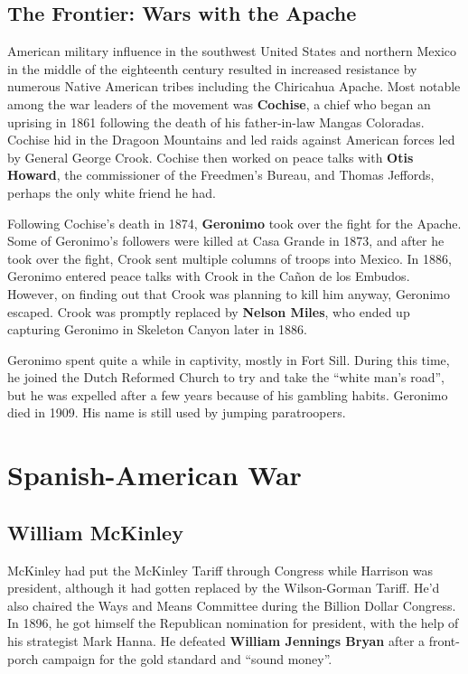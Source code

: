\subsection*{The Frontier: Wars with the Apache}

American military influence in the southwest United States and northern Mexico in the middle of the eighteenth century
resulted in increased resistance by numerous Native American tribes including the Chiricahua Apache.
Most notable among the war leaders of the movement was \textbf{Cochise},
a chief who began an uprising in 1861 following the death of his father-in-law Mangas Coloradas.
Cochise hid in the Dragoon Mountains and led raids against American forces led by General George Crook.
Cochise then worked on peace talks with \textbf{Otis Howard}, the commissioner of the Freedmen's Bureau,
and Thomas Jeffords, perhaps the only white friend he had.

Following Cochise's death in 1874, \textbf{Geronimo} took over the fight for the Apache.
Some of Geronimo's followers were killed at Casa Grande in 1873,
and after he took over the fight, Crook sent multiple columns of troops into Mexico.
In 1886, Geronimo entered peace talks with Crook in the Ca\~non de los Embudos.
However, on finding out that Crook was planning to kill him anyway, Geronimo escaped.
Crook was promptly replaced by \textbf{Nelson Miles}, who ended up capturing Geronimo in Skeleton Canyon later in 1886.

Geronimo spent quite a while in captivity, mostly in Fort Sill.
During this time, he joined the Dutch Reformed Church to try and take the ``white man's road'',
but he was expelled after a few years because of his gambling habits.
Geronimo died in 1909.
His name is still used by jumping paratroopers.

\section{Spanish-American War}

\subsection*{William McKinley}

McKinley had put the McKinley Tariff through Congress while Harrison was president,
although it had gotten replaced by the Wilson-Gorman Tariff.
He'd also chaired the Ways and Means Committee during the Billion Dollar Congress.
In 1896, he got himself the Republican nomination for president,
with the help of his strategist Mark Hanna.
He defeated \textbf{William Jennings Bryan} after a front-porch campaign for the gold standard and ``sound money''.

